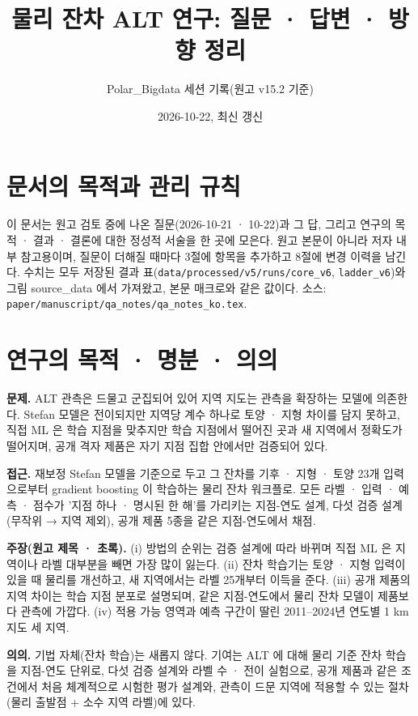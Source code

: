 \documentclass[10pt,a4paper]{article}
\title{\large 물리 잔차 ALT 연구: 질문 · 답변 · 방향 정리}
\author{\normalsize Polar\_Bigdata 세션 기록(원고 v15.2 기준)}\date{\normalsize 2026-10-22, 최신 갱신}
\begin{document}
\maketitle

\section{문서의 목적과 관리 규칙}
이 문서는 원고 검토 중에 나온 질문(2026-10-21 · 10-22)과 그 답, 그리고 연구의 목적 · 결과 · 결론에 대한 정성적 서술을 한 곳에 모은다. 원고 본문이 아니라 저자 내부 참고용이며, 질문이 더해질 때마다 3절에 항목을 추가하고 8절에 변경 이력을 남긴다. 수치는 모두 저장된 결과 표(\texttt{data/processed/v5/runs/core\_v6}, \texttt{ladder\_v6})와 그림 source\_data 에서 가져왔고, 본문 매크로와 같은 값이다. 소스: \texttt{paper/manuscript/qa\_notes/qa\_notes\_ko.tex}.

\section{연구의 목적 · 명분 · 의의}
\textbf{문제.} ALT 관측은 드물고 군집되어 있어 지역 지도는 관측을 확장하는 모델에 의존한다. Stefan 모델은 전이되지만 지역당 계수 하나로 토양 · 지형 차이를 담지 못하고, 직접 ML 은 학습 지점을 맞추지만 학습 지점에서 떨어진 곳과 새 지역에서 정확도가 떨어지며, 공개 격자 제품은 자기 지점 집합 안에서만 검증되어 있다.

\textbf{접근.} 재보정 Stefan 모델을 기준으로 두고 그 잔차를 기후 · 지형 · 토양 23개 입력으로부터 gradient boosting 이 학습하는 물리 잔차 워크플로. 모든 라벨 · 입력 · 예측 · 점수가 '지점 하나 · 명시된 한 해'를 가리키는 지점-연도 설계, 다섯 검증 설계(무작위 → 지역 제외), 공개 제품 5종을 같은 지점-연도에서 채점.

\textbf{주장(원고 제목 · 초록).} (i) 방법의 순위는 검증 설계에 따라 바뀌며 직접 ML 은 지역이나 라벨 대부분을 빼면 가장 많이 잃는다. (ii) 잔차 학습기는 토양 · 지형 입력이 있을 때 물리를 개선하고, 새 지역에서는 라벨 25개부터 이득을 준다. (iii) 공개 제품의 지역 차이는 학습 지점 분포로 설명되며, 같은 지점-연도에서 물리 잔차 모델이 제품보다 관측에 가깝다. (iv) 적용 가능 영역과 예측 구간이 딸린 2011--2024년 연도별 1 km 지도 세 지역.

\textbf{의의.} 기법 자체(잔차 학습)는 새롭지 않다. 기여는 ALT 에 대해 물리 기준 잔차 학습을 지점-연도 단위로, 다섯 검증 설계와 라벨 수 · 전이 실험으로, 공개 제품과 같은 조건에서 처음 체계적으로 시험한 평가 설계와, 관측이 드문 지역에 적용할 수 있는 절차(물리 출발점 + 소수 지역 라벨)에 있다.
\end{document}
